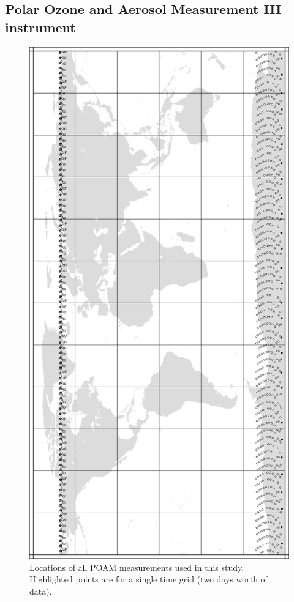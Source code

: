 \subsection{Polar Ozone and Aerosol Measurement III instrument}

\begin{figure}
    \includegraphics[angle=-90,width=0.9\linewidth]{POAM_loc.eps}
    \caption{Locations of all POAM measurements used in this study. Highlighted points are for a single time grid (two days worth of data).}
    \label{POAM_loc}
\end{figure}

